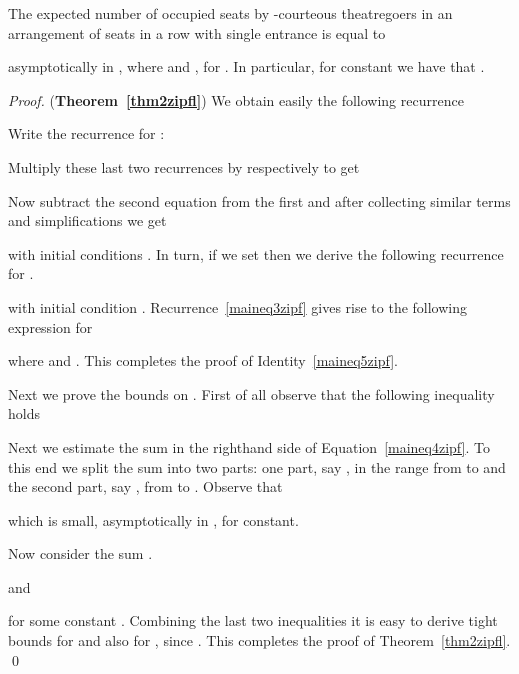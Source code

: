 \documentclass[11pt]{llncs}
\begin{document}
\begin{theorem}
\label{thm2zipfl}
The expected number of occupied seats by -courteous theatregoers
in an arrangement of  seats
in a row with single entrance is equal to

asymptotically in , where  and 
, for . In particular, for constant
 we have that .
\end{theorem}







\begin{proof} ({\bf Theorem~\ref{thm2zipfl}})
We obtain easily the following recurrence

Write the recurrence for :


Multiply these last two recurrences by  respectively to get


Now subtract the second equation from the first and after collecting
similar terms and simplifications
we get

with initial conditions .
In turn, if we set  then we 
derive the following recurrence for .

with initial condition .
Recurrence~\eqref{maineq3zipf} gives rise
to the following expression for 

where  and .
This completes the proof of Identity~\eqref{maineq5zipf}.

Next we prove the bounds on . 
First of all observe that the following inequality holds


Next we estimate the sum 
in the righthand side of Equation~\eqref{maineq4zipf}.
To this end we split the sum 
into two parts: one part, say , in the range from  to  and
the second part, say , from  to .
Observe that

which is small, asymptotically in , for  constant. 

Now consider the sum .

and

for some constant .
Combining the last two inequalities it is easy to derive tight
bounds for  and also for , since
.
This completes the proof of Theorem~\ref{thm2zipfl}.
\qed
\end{proof}
\end{document}
